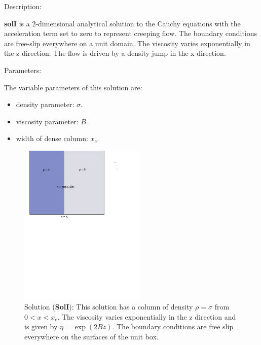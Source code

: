   {\large \fontB Description:}
  
  {\bf solI} is a 2-dimensional analytical solution to the Cauchy equations with the acceleration term set to zero
  to represent creeping flow. The boundary conditions are free-slip everywhere on a unit domain. 
  The viscosity varies exponentially in the z direction.
  The flow is driven by a density jump in the x direction.

 {\large \fontB Parameters:}
  
 The variable parameters of this solution are:
 \begin{itemize}
   \item{density parameter: $ \sigma $.}
   \item{viscosity parameter: $B$.}
   \item{width of dense column: $x_c$.}
 \end{itemize}

  \begin{figure}
    \includegraphics[width=6cm,clip]{../figs/figI.pdf}
    \caption[Short caption]{\label{figI} 
      Solution ({\bf SolI}):
      This solution has a column of density $\rho = \sigma$ from $0 < x < x_c$.
      The viscosity varies exponentially in the z direction and is given by
      $\eta = \exp (2 B z)$.
      The boundary conditions are free slip everywhere on the surfaces of the unit box.}
  \end{figure} 
  

